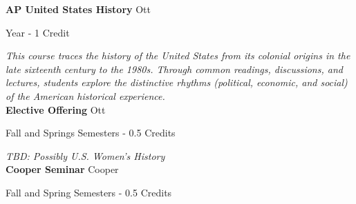 \noindent\textbf{AP United States History} \hfill Ott

\noindent Year - 1 Credit

\vspace{1mm}\emph{This course traces the history of the United States from its colonial origins in the late sixteenth century to the 1980s. Through common readings, discussions, and lectures, students explore the distinctive rhythms (political, economic, and social) of the American historical experience. }\\

\noindent\textbf{Elective Offering} \hfill Ott

\noindent Fall and Springs Semesters - 0.5 Credits

\vspace{1mm}\emph{TBD:  Possibly U.S. Women's History}\\

%
%

%
%

\noindent\textbf{Cooper Seminar} \hfill Cooper

\noindent Fall and Spring Semesters - 0.5 Credits

